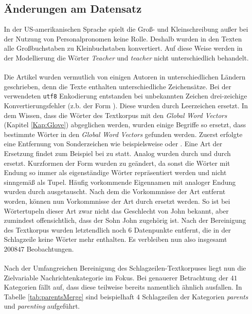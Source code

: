 \documentclass[a4paper,11pt]{article}
\begin{document}
\subsection{Änderungen am Datensatz}

In der US-amerikanischen Sprache spielt die Groß- und Kleinschreibung außer bei der Nutzung von Personalpronomen keine Rolle. Deshalb wurden in den Texten alle Großbuchstaben zu Kleinbuchstaben konvertiert. Auf diese Weise werden in der Modellierung die Wörter \textit{Teacher} und \textit{teacher} nicht unterschiedlich behandelt. \\
\\
Die Artikel wurden vermutlich von einigen Autoren in unterschiedlichen Ländern geschrieben, denn die Texte enthalten unterschiedliche Zeichensätze. Bei der verwendeten \texttt{utf8} Enkodierung entstanden bei unbekannten Zeichen drei-zeichige Konvertierungsfehler (z.b. der Form ). Diese wurden durch Leerzeichen ersetzt. In dem Wissen, dass die Wörter des Textkorpus mit den \textit{Global Word Vectors} (Kapitel \ref{Kap:Glove}) abgeglichen werden, wurden einige Begriffe so ersetzt, dass bestimmte Wörter in den \textit{Global Word Vectors} gefunden werden. Zuerst erfolgte eine Entfernung von Sonderzeichen wie beispielsweise  oder . Eine Art der Ersetzung findet zum Beispiel bei  zu  statt. Analog wurden  durch  und  durch  ersetzt. Kurzformen der Form  wurden zu  geändert, da sonst die Wörter mit Endung  so immer als eigenständige Wörter repräsentiert werden und nicht sinngemäß als Tupel. Häufig vorkommende Eigennamen mit analoger Endung  wurden durch  ausgetauscht. Nach dem die Vorkommnisse der Art  entfernt worden, können nun Vorkommnisse der Art  durch  ersetzt werden. So ist bei Wörtertupeln dieser Art zwar nicht das Geschlecht von John bekannt, aber zumindest offensichtlich, dass der Sohn John zugehörig ist. Nach der Bereinigung des Textkorpus wurden letztendlich noch $6$ Datenpunkte entfernt, die in der Schlagzeile keine Wörter mehr enthalten. Es verbleiben nun also insgesamt $200847$ Beobachtungen.\\
\\
Nach der Umfangreichen Bereinigung des Schlagzeilen-Textkorpuses liegt nun die Zielvariable Nachrichtenkategorie im Fokus.
Bei genauerer Betrachtung der $41$ Kategorien fällt auf, dass diese teilweise bereits namentlich ähnlich ausfallen. In Tabelle \ref{tab:parentsMerge} sind beispielhaft $4$ Schlagzeilen der Kategorien \textit{parents} und \textit{parenting} aufgeführt.
\end{document}
